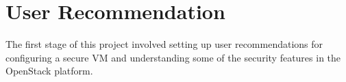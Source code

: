 \documentclass[12pt]{article}
\begin{document}
\section{User Recommendation}
The first stage of this project involved setting up user recommendations for configuring a secure VM and understanding some of the security features in the OpenStack platform.


\newpage


\end{document}
